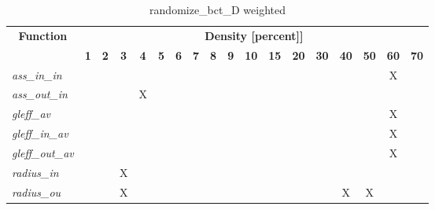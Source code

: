 \begin{table}[h] \centering \begin{tabular}{|l|c|c|c|c|c|c|c|c|c|c|c|c|c|c|c|c|c|} \hline\multicolumn{1}{|c|}{\textbf{\large{Function}}} & \multicolumn{17}{c|}{\large{\textbf{Density [percent]]}}}\\\cline{2-18}  & \textbf{1} &  \textbf{2} &  \textbf{3} &  \textbf{4} &  \textbf{5} &  \textbf{6} &  \textbf{7} &  \textbf{8} &  \textbf{9} &  \textbf{10} &  \textbf{15} &  \textbf{20} &  \textbf{30} &  \textbf{40} &  \textbf{50} &  \textbf{60} &  \textbf{70} \\ \hline   \textit{ass\_in\_in} &   &   &   &   &   &   &   &   &   &   &   &   &   &   &   & X &   \\ \hline  \textit{ass\_out\_in} &   &   &   & X &   &   &   &   &   &   &   &   &   &   &   &   &   \\ \hline  \textit{gleff\_av} &   &   &   &   &   &   &   &   &   &   &   &   &   &   &   & X &   \\ \hline  \textit{gleff\_in\_av} &   &   &   &   &   &   &   &   &   &   &   &   &   &   &   & X &   \\ \hline  \textit{gleff\_out\_av} &   &   &   &   &   &   &   &   &   &   &   &   &   &   &   & X &   \\ \hline  \textit{radius\_in} &   &   & X &   &   &   &   &   &   &   &   &   &   &   &   &   &   \\ \hline  \textit{radius\_ou} &   &   & X &   &   &   &   &   &   &   &   &   &   & X & X &   &   \\ \hline \end{tabular}\caption{randomize\_bct\_D weighted}\label{tab:my_label} \end{table}